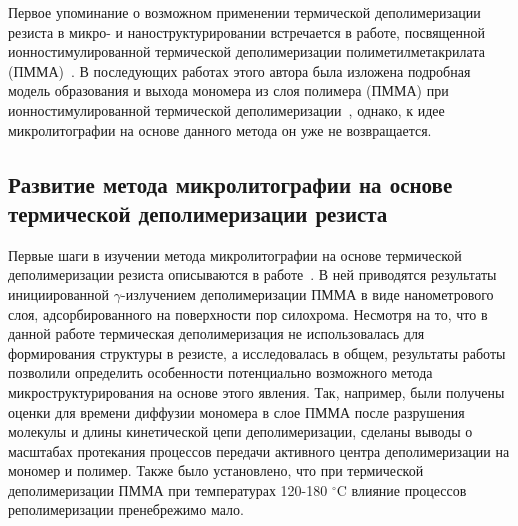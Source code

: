 Первое упоминание о возможном применении термической деполимеризации резиста в микро- и наноструктурировании встречается в работе, посвященной ионностимулированной термической деполимеризации полиметилметакрилата (ПММА)~\cite{Fragala_1}. В последующих работах этого автора была изложена подробная модель образования и выхода мономера из слоя полимера (ПММА) при ионностимулированной термической деполимеризации~\cite{Fragala_2,Fragala_3_diffusion}, \linebreak однако, к идее микролитографии на основе данного метода он уже не возвращается.


\subsection{Развитие метода микролитографии на основе термической деполимеризации резиста}
Первые шаги в изучении метода микролитографии на основе термической деполимеризации резиста описываются в работе~\cite{Bruk_2000}. В ней приводятся результаты инициированной $\gamma$-излучением деполимеризации ПММА в виде нанометрового слоя, адсорбированного на поверхности пор силохрома. Несмотря на то, что в данной работе термическая деполимеризация не использовалась для формирования структуры в резисте, а исследовалась в общем, результаты работы позволили определить особенности потенциально возможного метода микроструктурирования на основе этого явления. Так, например, были получены оценки для времени диффузии мономера в слое ПММА после разрушения молекулы и длины кинетической цепи деполимеризации, сделаны выводы о масштабах протекания процессов передачи активного центра деполимеризации на мономер и полимер. Также было установлено, что при термической деполимеризации ПММА при температурах 120-180 $^\circ$C влияние процессов реполимеризации пренебрежимо мало.

